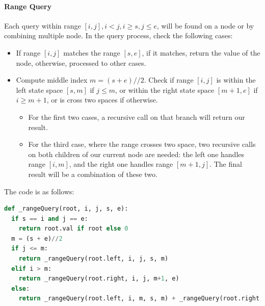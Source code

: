 \documentclass[main.tex]{subfiles}
\begin{document}
\paragraph{Range  Query}  Each query within range $[i, j], i < j, i\geq s, j \leq e$, will be found on a node or by combining multiple node. In the query process,  check the following cases:
\begin{itemize}
    \item 
    If range $[i, j]$ matches the range $[s, e]$, if it matches, return the value of the node, otherwise, processed to other cases.
    \item  Compute middle index $m = (s + e) // 2$. Check if range $[i, j]$ is within the left state space $[s, m]$ if $j\leq m$, or within the right state space $[m+1, e]$ if $i\geq m+1$, or is cross two spaces if otherwise. 
    \begin{itemize}
    \item For the first two cases, a recursive call on that branch will return our result.
    \item For the third case, where the range crosses two space, two recursive calls on both children of our current node are needed: the left one handles range $[i, m]$, and the right one handles range $[m+1, j]$. The final result will be a combination of these two. 
    \end{itemize}
\end{itemize}
The code is as follows: 
\begin{lstlisting}[language=Python]
def _rangeQuery(root, i, j, s, e): 
  if s == i and j == e:
    return root.val if root else 0 
  m = (s + e)//2
  if j <= m:
    return _rangeQuery(root.left, i, j, s, m)
  elif i > m:
    return _rangeQuery(root.right, i, j, m+1, e)
  else:
    return _rangeQuery(root.left, i, m, s, m) + _rangeQuery(root.right, m+1, j, m+1, e)
\end{lstlisting}

            
\end{document}
